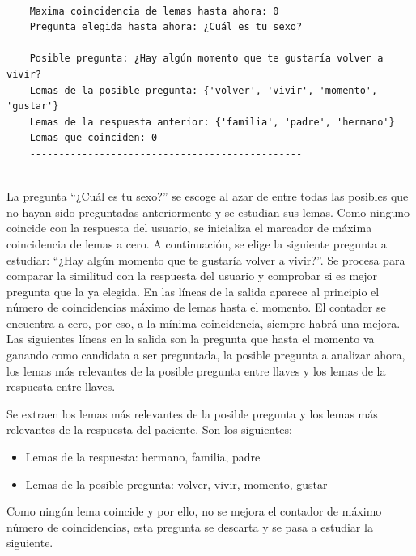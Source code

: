 \begin{verbatim}
	
	Maxima coincidencia de lemas hasta ahora: 0
	Pregunta elegida hasta ahora: ¿Cuál es tu sexo?
	
	Posible pregunta: ¿Hay algún momento que te gustaría volver a vivir?
	Lemas de la posible pregunta: {'volver', 'vivir', 'momento', 'gustar'}
	Lemas de la respuesta anterior: {'familia', 'padre', 'hermano'}
	Lemas que coinciden: 0
	-----------------------------------------------
	
\end{verbatim}

La pregunta ``¿Cuál es tu sexo?'' se escoge al azar de entre todas las posibles que no hayan sido preguntadas anteriormente y se estudian sus lemas. Como ninguno coincide con la respuesta del usuario, se inicializa el marcador de máxima coincidencia de lemas a cero. A continuación, se elige la siguiente pregunta a estudiar: ``¿Hay algún momento que te gustaría volver a vivir?''. Se procesa para comparar la similitud con la respuesta del usuario y comprobar si es mejor pregunta que la ya elegida. En las líneas de la salida aparece al principio el número de coincidencias máximo de lemas hasta el momento. El contador se encuentra a cero, por eso, a la mínima coincidencia, siempre habrá una mejora. Las siguientes líneas en la salida son la pregunta que hasta el momento va ganando como candidata a ser preguntada, la posible pregunta a analizar ahora, los lemas más relevantes de la posible pregunta entre llaves y los lemas de la respuesta entre llaves.

Se extraen los lemas más relevantes de la posible pregunta y los lemas más relevantes de la respuesta del paciente. Son los siguientes: 

\begin{itemize}
	\item[] Lemas de la respuesta: \hspace{2cm} hermano, familia, padre
	\item[] Lemas de la posible pregunta: \hspace{0.8cm} volver, vivir, momento, gustar
\end{itemize}

Como ningún lema coincide y por ello, no se mejora el contador de máximo número de coincidencias, esta pregunta se descarta y se pasa a estudiar la siguiente.

